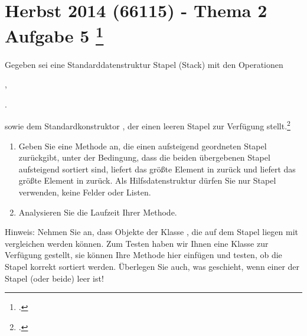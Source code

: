 \documentclass{lehramt-informatik-aufgabe}
\begin{document}

\section{Herbst 2014 (66115) - Thema 2 Aufgabe 5
\footcite[Herbst 2014 (66115) - Thema 2 Aufgabe 5, Seite 5]{examen:66115:2014:09}}

Gegeben sei eine Standarddatenstruktur Stapel (Stack) mit den Operationen

\begin{compactitem}
\item {}
\item {},
\item {}.
\end{compactitem}

sowie dem Standardkonstruktor , der einen leeren Stapel
zur Verfügung stellt.\footcite[Seite 2-3, Aufgabe 5]{aud:ab:4}

\begin{enumerate}


\item Geben Sie eine Methode  an,
die einen aufsteigend geordneten Stapel zurückgibt, unter der Bedingung,
dass die beiden übergebenen Stapel aufsteigend sortiert sind, \dh
{} liefert das größte Element in  zurück und
 liefert das größte Element in  zurück. Als
Hilfsdatenstruktur dürfen Sie nur Stapel verwenden, keine Felder oder
Listen.

\begin{liAntwort}
\end{liAntwort}


\item Analysieren Sie die Laufzeit Ihrer Methode.

\end{enumerate}

\noindent
Hinweis: Nehmen Sie an, dass Objekte der Klasse , die auf
dem Stapel liegen mit  vergleichen werden können. Zum
Testen haben wir Ihnen eine Klasse  zur Verfügung
gestellt, sie können Ihre Methode hier einfügen und testen, ob die
Stapel korrekt sortiert werden. Überlegen Sie auch, was geschieht, wenn
einer der Stapel (oder beide) leer ist!
\end{document}
